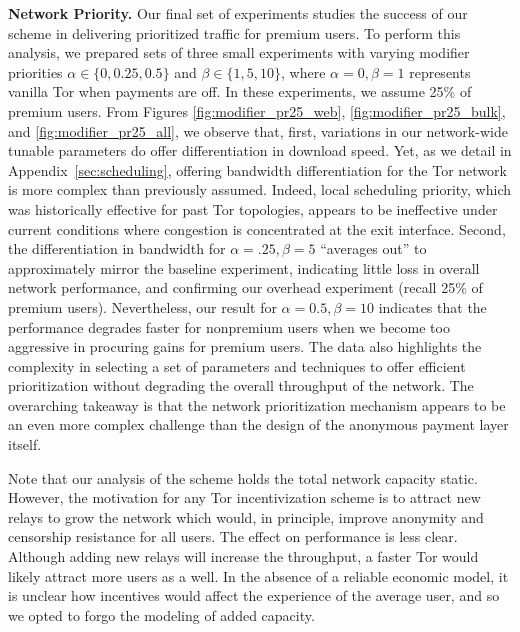 \medskip \noindent \textbf{Network Priority.}
\label{sec:priority_exp} Our final set of experiments studies the success of our scheme in delivering prioritized traffic for premium users.
To perform this analysis, we prepared sets of three small experiments with varying modifier priorities $\alpha \in \{0, 0.25, 0.5\}$ and $\beta \in \{1, 5, 10\}$, where $\alpha = 0, \beta = 1$ represents vanilla Tor when payments are off.
In these experiments, we assume 25\% of premium users.
From Figures \ref{fig:modifier_pr25_web}, \ref{fig:modifier_pr25_bulk}, and \ref{fig:modifier_pr25_all}, we observe that, first, variations in our network-wide tunable parameters do offer differentiation in download speed.
Yet, as we detail in Appendix~\ref{sec:scheduling}, offering bandwidth differentiation for the Tor network is more complex than previously assumed.
Indeed, local scheduling priority, which was historically effective for past Tor topologies, appears to be ineffective under current conditions where congestion is concentrated at the exit interface.
Second, the differentiation in bandwidth for $\alpha = .25, \beta=5$ ``averages out'' to approximately mirror the baseline experiment, indicating little loss in overall network performance, and confirming our overhead experiment (recall 25\% of premium users).
Nevertheless, our result for $\alpha = 0.5, \beta=10$ indicates that the performance degrades faster for nonpremium users when we become too aggressive in procuring gains for premium users.
The data also highlights the complexity in selecting a set of parameters and techniques to offer efficient prioritization without degrading the overall throughput of the network.
The overarching takeaway is that the network prioritization mechanism appears to be an even more complex challenge than the design of the anonymous payment layer itself.

Note that our analysis of the scheme holds the total network capacity static.
However, the motivation for any Tor incentivization scheme is to attract new relays to grow the network which would, in principle, improve anonymity and censorship resistance for all users.
The effect on performance is less clear.
Although adding new relays will increase the throughput, a faster Tor would likely attract more users as a well.
In the absence of a reliable economic model, it is unclear how incentives would affect the experience of the average user, and so we opted to forgo the modeling of added capacity.

